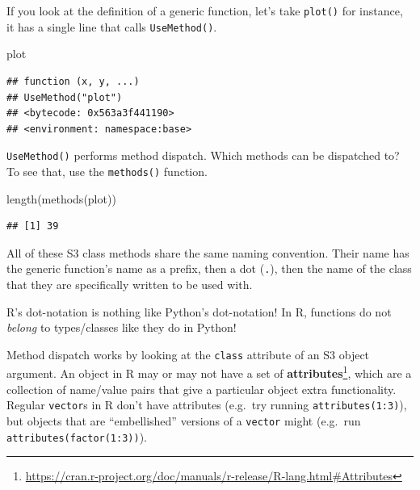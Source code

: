 \documentclass[
  12pt,
  krantz2]{krantz}
\makeatletter
\newenvironment{Shaded}{\begin{snugshade}}{\end{snugshade}}
\newcommand{\FunctionTok}[1]{\textcolor[rgb]{0,0,0}{#1}}
\newcommand{\NormalTok}[1]{#1}
\renewcommand{\href}[2]{#2\footnote{\url{#1}}}
\newenvironment{kframe}{%
\medskip{}
\setlength{\fboxsep}{.8em}
 \def\at@end@of@kframe{}%
 \ifinner\ifhmode%
  \def\at@end@of@kframe{\end{minipage}}%
  \begin{minipage}{\columnwidth}%
 \fi\fi%
 \def\FrameCommand##1{\hskip\@totalleftmargin \hskip-\fboxsep
 \colorbox{shadecolor}{##1}\hskip-\fboxsep
     \hskip-\linewidth \hskip-\@totalleftmargin \hskip\columnwidth}%
 \MakeFramed {\advance\hsize-\width
   \@totalleftmargin\z@ \linewidth\hsize
   \@setminipage}}%
 {\par\unskip\endMakeFramed%
 \at@end@of@kframe}
\renewenvironment{Shaded}{\begin{kframe}}{\end{kframe}}
\newenvironment{rmd-caution}{\begin{lrbox}{\rmdbox}
  \minipage[c]{\dimexpr \textwidth-2\fboxrule-\wd\excl-\columnsep}
    \vspace*{\columnsep}}%
{\vspace*{\columnsep}\endminipage\end{lrbox}%
  {\par\color{yellow}\fboxsep=0pt
    \fbox{\usebox\excl\usebox\rmdbox\hspace{\columnsep}}\par}}
\makeatother
\begin{document}
If you look at the definition of a generic function, let's take \texttt{plot()} for instance, it has a single line that calls \texttt{UseMethod()}.

\begin{Shaded}
\begin{Highlighting}[]
\NormalTok{plot}
\end{Highlighting}
\end{Shaded}

\begin{verbatim}
## function (x, y, ...) 
## UseMethod("plot")
## <bytecode: 0x563a3f441190>
## <environment: namespace:base>
\end{verbatim}

\texttt{UseMethod()} performs method dispatch. Which methods can be dispatched to? To see that, use the \texttt{methods()} function.

\begin{Shaded}
\begin{Highlighting}[]
\FunctionTok{length}\NormalTok{(}\FunctionTok{methods}\NormalTok{(plot))}
\end{Highlighting}
\end{Shaded}

\begin{verbatim}
## [1] 39
\end{verbatim}

All of these S3 class methods share the same naming convention. Their name has the generic function's name as a prefix, then a dot (\texttt{.}), then the name of the class that they are specifically written to be used with.

\begin{rmd-caution}
R's dot-notation is nothing like Python's dot-notation! In R, functions do not \emph{belong} to types/classes like they do in Python!

\end{rmd-caution}

Method dispatch works by looking at the \texttt{class} attribute of an S3 object argument. An object in R may or may not have a set of \href{https://cran.r-project.org/doc/manuals/r-release/R-lang.html\#Attributes}{\textbf{attributes}}, which are a collection of name/value pairs that give a particular object extra functionality. Regular \texttt{vector}s in R don't have attributes (e.g.~try running \texttt{attributes(1:3)}), but objects that are ``embellished'' versions of a \texttt{vector} might (e.g.~run \texttt{attributes(factor(1:3))}).
\end{document}
